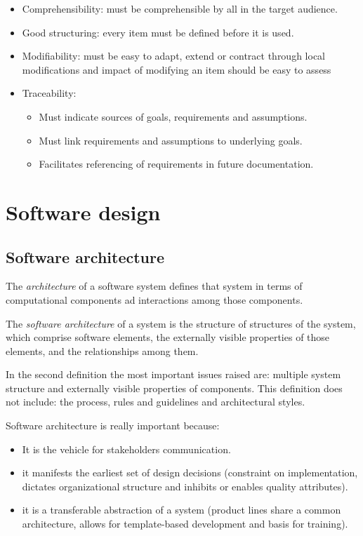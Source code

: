 \documentclass[12pt, a4paper]{report}
\newtheorem[style=M,bodystyle=\normalfont]{theorem}{Theorem}
\newtheorem[style=M,bodystyle=\normalfont]{corollary}{Corollary}
\newtheorem[style=M,bodystyle=\normalfont]{lemma}{Lemma}
\newtheorem[style=M,bodystyle=\normalfont]{definition}{Definition}
\begin{document}
\begin{itemize}
        \item Comprehensibility: must be comprehensible by all in the target audience.
        \item Good structuring: every item must be defined before it is used.
        \item Modifiability: must be easy to adapt, extend or contract through local modifications and impact of modifying an item should be easy to assess
        \item Traceability: 
        \begin{itemize}
            \item Must indicate sources of goals, requirements and assumptions. 
            \item Must link requirements and assumptions to underlying goals.
            \item Facilitates referencing of requirements in future documentation.
        \end{itemize}
    \end{itemize}

\newpage

\chapter{Software design}
\section{Software architecture}
    \begin{definition}
        The \emph{architecture} of a software system defines that system in terms of computational components ad interactions among those components.
    \end{definition}
    \begin{definition}
        The \emph{software architecture} of a system is the structure of structures of the system, which comprise software elements, the externally visible properties of those elements, and the relationships among them.
    \end{definition}
    In the second definition the most important issues raised are: multiple system structure and externally visible properties of components. This definition does not include: the process, rules and guidelines and architectural styles.
    \par
    Software architecture is really important because: 
    \begin{itemize}
        \item It is the vehicle for stakeholders communication.
        \item it manifests the earliest set of design decisions (constraint on implementation, dictates organizational structure and inhibits or enables quality attributes).
        \item it is a transferable abstraction of a system (product lines share a common architecture, allows for template-based development and basis for training).
    \end{itemize}
\end{document}
